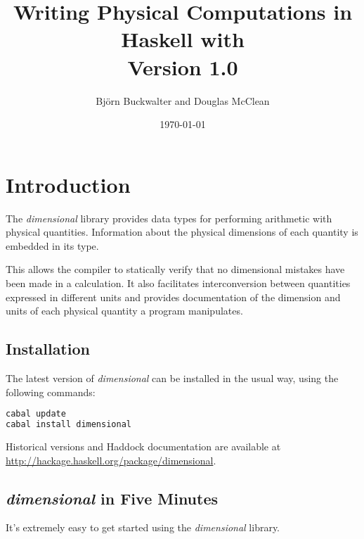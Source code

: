\documentclass[11pt]{report}
\title{
	{Writing Physical Computations in Haskell with \thispackage}\\
	{\small{Version 1.0}}
}
\author{Björn Buckwalter and Douglas McClean}
\date{\today}
\newcommand{\packagename}[1]{\textit{#1}}
\newcommand{\thispackage}{\packagename{dimensional}}
\begin{document}
\maketitle

\tableofcontents

\chapter{Introduction}

The \thispackage{} library provides data types for performing arithmetic with physical
quantities. Information about the physical dimensions of each quantity is embedded in
its type.

This allows the compiler to statically verify that no dimensional mistakes have been
made in a calculation. It also facilitates interconversion between quantities expressed
in different units and provides documentation of the dimension and units of each physical
quantity a program manipulates.

\section{Installation}

The latest version of \thispackage{} can be installed in the usual way, using the following commands:

\begin{lstlisting}[language=bash]
cabal update
cabal install dimensional
\end{lstlisting}

Historical versions and Haddock documentation are available at \url{http://hackage.haskell.org/package/dimensional}.

\section{\thispackage{} in Five Minutes}

It's extremely easy to get started using the \thispackage{} library.
\end{document}
